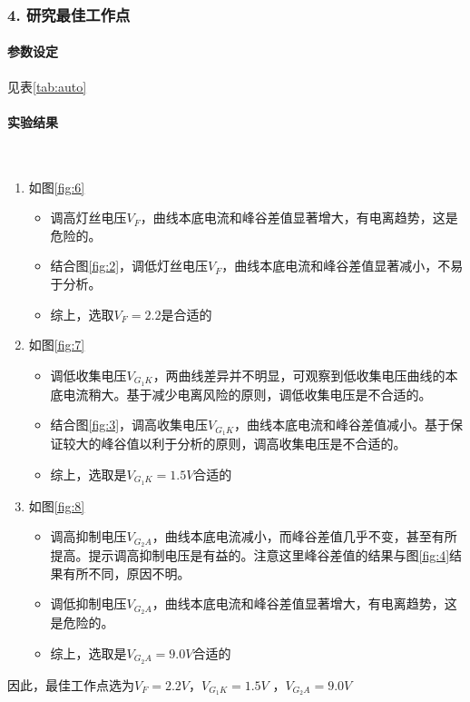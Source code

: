 \documentclass[12pt,a4paper,UTF8]{ctexart}
\begin{document}
	\subsubsection*{4. 研究最佳工作点}
		\paragraph{参数设定}见表\ref{tab:auto}
		\paragraph{实验结果}~
		\newline
		\indent
		\begin{enumerate}[label=\arabic*.]
			\item 如图\ref{fig:6}
				\begin{itemize}
					\item 调高灯丝电压$V_F$，曲线本底电流和峰谷差值显著增大，有电离趋势，这是危险的。
					\item 结合图\ref{fig:2}，调低灯丝电压$V_F$，曲线本底电流和峰谷差值显著减小，不易于分析。
					\item 综上，选取$V_F=2.2$是合适的
				\end{itemize}
			\item 如图\ref{fig:7}
				\begin{itemize}
					\item 调低收集电压$V_{G_1K}$，两曲线差异并不明显，可观察到低收集电压曲线的本底电流稍大。基于减少电离风险的原则，调低收集电压是不合适的。
					\item 结合图\ref{fig:3}，调高收集电压$V_{G_1K}$，曲线本底电流和峰谷差值减小。基于保证较大的峰谷值以利于分析的原则，调高收集电压是不合适的。
					\item 综上，选取是$V_{G_1K}=1.5V$合适的
				\end{itemize}
			\item 如图\ref{fig:8}
				\begin{itemize}
					\item 调高抑制电压$V_{G_2A}$，曲线本底电流减小，而峰谷差值几乎不变，甚至有所提高。提示调高抑制电压是有益的。注意这里峰谷差值的结果与图\ref{fig:4}结果有所不同，原因不明。
					\item 调低抑制电压$V_{G_2A}$，曲线本底电流和峰谷差值显著增大，有电离趋势，这是危险的。
					\item 综上，选取是$V_{G_2A}=9.0V$合适的
				\end{itemize}
		\end{enumerate}
		因此，最佳工作点选为$V_F=2.2V$，$V_{G_1K}=1.5V$ ，$V_{G_2A}=9.0V$
\end{document}
